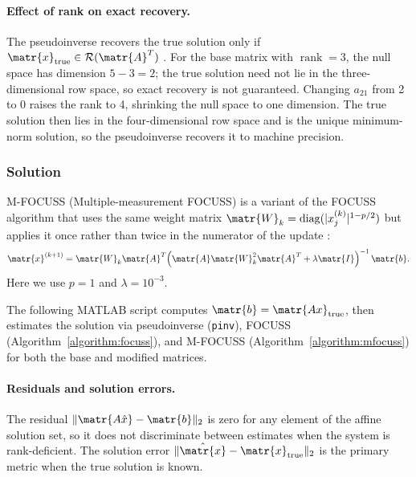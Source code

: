\paragraph{Effect of rank on exact recovery.}
The pseudoinverse recovers the true solution only if
$\matr{x}_{\mathrm{true}}\in\mathcal{R}(\matr{A}^T)$ \citep{Zdunek}.
For the base matrix with $\operatorname{rank}=3$, the null space has dimension
$5-3=2$; the true solution need not lie in the three-dimensional row space, so
exact recovery is not guaranteed.
Changing $a_{21}$ from 2 to 0 raises the rank to 4, shrinking the null space to
one dimension.
The true solution then lies in the four-dimensional row space and is the unique
minimum-norm solution, so the pseudoinverse recovers it to machine precision.
\subsubsection*{Solution}
M-FOCUSS (Multiple-measurement FOCUSS) is a variant of the FOCUSS algorithm
that uses the same weight matrix $\matr{W}_k = \operatorname{diag}(|x_j^{(k)}|^{1-p/2})$
but applies it once rather than twice in the numerator of the update
\citep{GorodRao97}:
\begin{equation*}
  \matr{x}^{(k+1)}
  = \matr{W}_k \matr{A}^T
    \!\left(\matr{A}\matr{W}_k^2\matr{A}^T + \lambda\matr{I}\right)^{-1}
    \matr{b}.
\end{equation*}
Here we use $p=1$ and $\lambda=10^{-3}$.

The following MATLAB script computes $\matr{b}=\matr{Ax}_{\mathrm{true}}$, then
estimates the solution via pseudoinverse (\texttt{pinv}), FOCUSS
(Algorithm~\ref{algorithm:focuss}), and M-FOCUSS
(Algorithm~\ref{algorithm:mfocuss}) for both the base and modified matrices.



\paragraph{Residuals and solution errors.}
The residual $\|\matr{A\hat{x}}-\matr{b}\|_2$ is zero for any element of the
affine solution set, so it does not discriminate between estimates when the
system is rank-deficient.
The solution error $\|\hat{\matr{x}}-\matr{x}_{\mathrm{true}}\|_2$ is the
primary metric when the true solution is known.

